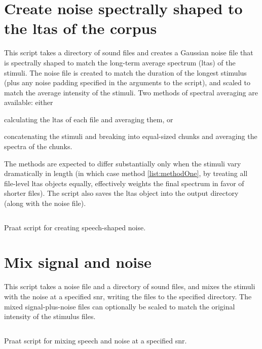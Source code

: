 \section[Create speech-shaped noise]{Create noise spectrally shaped to the \ac{ltas} of the corpus}
This script takes a directory of sound files and creates a Gaussian noise file that is spectrally shaped to match the long-term average spectrum (\ac{ltas}) of the stimuli.  The noise file is created to match the duration of the longest stimulus (plus any noise padding specified in the arguments to the script), and scaled to match the average intensity of the stimuli.  Two methods of spectral averaging are available: either
\begin{inparaenum}
\item calculating the \ac{ltas} of each file and averaging them, or \label{list:methodOne} 
\item concatenating the stimuli and breaking into equal-sized chunks and averaging the spectra of the chunks.  
\end{inparaenum}
The methods are expected to differ substantially only when the stimuli vary dramatically in length (in which case method \ref{list:methodOne}, by treating all file-level \ac{ltas} objects equally, effectively weights the final spectrum in favor of shorter files).  The script also saves the \ac{ltas} object into the output directory (along with the noise file).
 \begin{code}
	\inputminted[fontsize=\footnotesize, tabsize=2]{r}{../scripts/dissversions/LTASNoise_DissVersion.praat}
	\caption[Create speech-shaped noise]{Praat script for creating speech-shaped noise.\label{lst:LTASNoise}}
\end{code}
\newpage

\section{Mix signal and noise}
This script takes a noise file and a directory of sound files, and mixes the stimuli with the noise at a specified \ac{snr}, writing the files to the specified directory.  The mixed signal-plus-noise files can optionally be scaled to match the original intensity of the stimulus files. 
\begin{code}
	\inputminted[fontsize=\footnotesize, tabsize=2]{r}{../scripts/dissversions/MixSpeechNoise_DissVersion.praat}
	\caption[Mix signal and noise]{Praat script for mixing speech and noise at a specified \ac{snr}.\label{lst:MixNoise}}
\end{code}
\newpage

